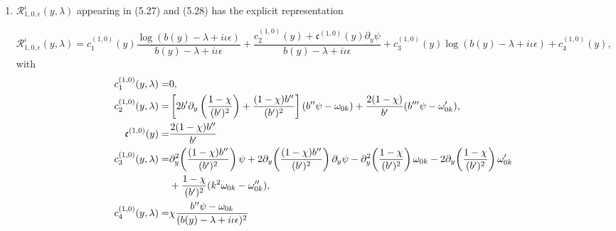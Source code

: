 \documentclass[reqno,11pt]{amsart}
\numberwithin{equation}{section}
\numberwithin{equation}{section} %
\begin{document}
    \begingroup
    \footnotesize
    \begin{enumerate}
      \item $\mathcal{R}^\iota_{1,0,\epsilon}(y,\lambda)$ appearing in (5.27) and (5.28) has the explicit representation
    
    \begin{equation}\label{ndR10}
    \mathcal{R}^\iota_{1,0,\epsilon}(y,\lambda) = c_1^{(1,0)}(y)\frac{\log(b(y)-\lambda+i\iota\epsilon)}{b(y)-\lambda+i\iota\epsilon}+\frac{c_2^{(1,0)}(y)+\mathfrak{c}^{(1,0)}(y)\partial_y\psi}{b(y)-\lambda+i\iota\epsilon}+c_{3}^{(1,0)}(y)\log(b(y)-\lambda+i\iota\epsilon)+c_4^{(1,0)}(y),
    \end{equation}
    with
    \begin{align}
      c_1^{(1,0)}(y,\lambda)=&0,\notag\\
      c_2^{(1,0)}(y,\lambda)=&\left[2b'\partial_y\left(\frac{1-\chi}{(b')^2}\right)+\frac{(1-\chi)b''}{(b')^2}\right](b''\psi-\omega_{0k})+\frac{2(1-\chi)}{b'}(b'''\psi-\omega_{0k}'),\notag\\
      \mathfrak{c}^{(1,0)}(y)=&\frac{2(1-\chi)b''}{b'}\notag\\
      c_{3}^{(1,0)}(y,\lambda)=&\partial_y^2\!\left(\frac{(1-\chi)b''}{(b')^2}\right)\psi+2\partial_y\!\left(\frac{(1-\chi)b''}{(b')^2}\right)\partial_y\psi-\partial_y^2\!\left(\frac{1-\chi}{(b')^2}\right)\omega_{0k}-2\partial_y\!\left(\frac{1-\chi}{(b')^2}\right)\omega_{0k}'\notag\\
      &+\frac{1-\chi}{(b')^2}(k^2\omega_{0k}-\omega_{0k}''),\notag\\
      c_4^{(1,0)}(y,\lambda)=&\chi\frac{b''\psi-\omega_{0k}}{(b(y)-\lambda+i\iota\epsilon)^2}\notag
    \end{align}




\end{enumerate}
\end{document}
